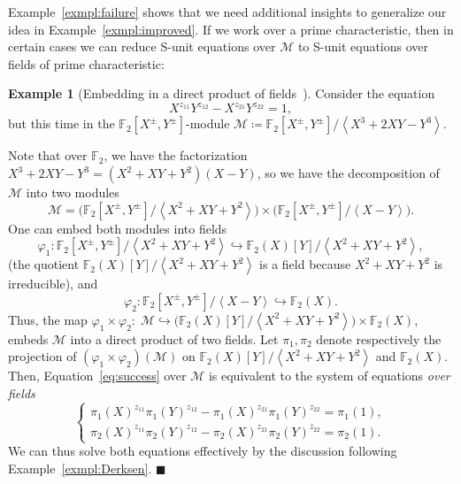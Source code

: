 \documentclass[letterpaper, 11pt, thm-restate]{article}
\numberwithin{equation}{section}
\newcommand{\F}{\mathbb{F}}
\newcommand{\mM}{\mathcal{M}}
\newcommand{\gen}[1]{\left\langle {#1} \right\rangle}
\theoremstyle{definition}
\theoremstyle{definition}
\newtheorem{exmpl}[thrm]{Example}
\theoremstyle{definition}
\begin{document}
Example~\ref{exmpl:failure} shows that we need additional insights to generalize our idea in Example~\ref{exmpl:improved}.
If we work over a prime characteristic, then in certain cases we can reduce S-unit equations over $\mM$ to S-unit equations over fields of prime characteristic:

\begin{exmpl}[{Embedding in a direct product of fields~\cite{derksen2007skolem, dong2024submonoid}}]\label{exmpl:success}
    Consider the equation
    \begin{equation}\label{eq:success}
        X^{z_{11}}Y^{z_{12}} - X^{z_{21}}Y^{z_{22}} = 1,
    \end{equation}
    but this time in the $\F_2[X^{\pm}, Y^{\pm}]$-module
    $
    \mM \coloneqq \F_2[X^{\pm}, Y^{\pm}]/\gen{X^3 + 2XY - Y^3}.
    $
    
    Note that over $\F_2$, we have the factorization $X^3 + 2XY - Y^3 = (X^2 + XY + Y^2)(X-Y)$, so we have the decomposition of $\mM$ into two modules
    \[
    \mM = \Big(\F_2[X^{\pm}, Y^{\pm}]/\gen{X^2 + XY + Y^2}\Big) \times \Big(\F_2[X^{\pm}, Y^{\pm}]/\gen{X - Y}\Big).
    \]
    One can embed both modules into fields 
    \[
    \varphi_1 \colon \F_2[X^{\pm}, Y^{\pm}]/\gen{X^2 + XY + Y^2} \hookrightarrow \F_2(X)[Y]/\gen{X^2 + XY + Y^2},
    \]
    (the quotient $\F_2(X)[Y]/\gen{X^2 + XY + Y^2}$ is a field because $X^2 + XY + Y^2$ is irreducible), and
    \[
    \varphi_2 \colon \F_2[X^{\pm}, Y^{\pm}]/\gen{X - Y} \hookrightarrow \F_2(X).
    \]
    Thus, the map 
    $
    \varphi_1 \times \varphi_2 \colon \; \mM \hookrightarrow \Big(\F_2(X)[Y]/\gen{X^2 + XY + Y^2} \Big) \times \F_2(X)
    $,
    embeds $\mM$ into a direct product of two fields.
    Let $\pi_1, \pi_2$ denote respectively the projection of $(\varphi_1 \times \varphi_2) (\mM)$ on $\F_2(X)[Y]/\gen{X^2 + XY + Y^2}$ and $\F_2(X)$.
    Then, Equation~\eqref{eq:success} over $\mM$ is equivalent to the system of equations \emph{over fields}
    \begin{equation}\label{eq:successsys}
    \begin{cases}
        \pi_1(X)^{z_{11}} \pi_1(Y)^{z_{12}} - \pi_1(X)^{z_{21}}\pi_1(Y)^{z_{22}} = \pi_1(1), \\
        \pi_2(X)^{z_{11}} \pi_2(Y)^{z_{12}} - \pi_2(X)^{z_{21}}\pi_2(Y)^{z_{22}} = \pi_2(1).
    \end{cases}
    \end{equation}
    We can thus solve both equations effectively by the discussion following Example~\ref{exmpl:Derksen}.
    \hfill $\blacksquare$
\end{exmpl}
\end{document}

